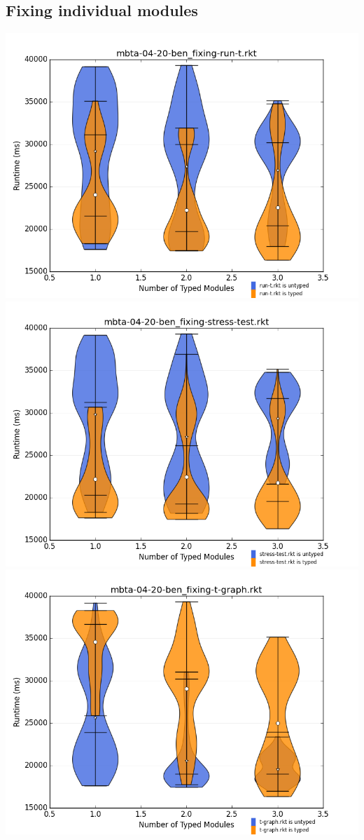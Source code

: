 \documentclass{article}
\begin{document}
\subsection{Fixing individual modules}
\includegraphics[width=\textwidth]{mbta-04-20-ben_fixing-run-t.rkt-dv.png}
\includegraphics[width=\textwidth]{mbta-04-20-ben_fixing-stress-test.rkt-dv.png}
\includegraphics[width=\textwidth]{mbta-04-20-ben_fixing-t-graph.rkt-dv.png}
\end{document}
